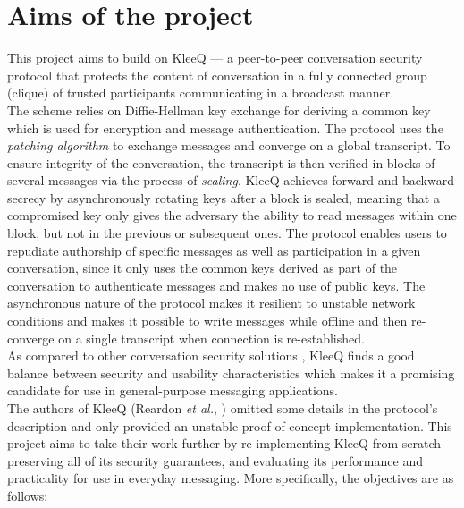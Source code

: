 \documentclass[a4paper, twoside, 12pt]{report}
\begin{document}
\section{Aims of the project}
\label{sec:intro.aims}
This project aims to build on KleeQ \cite{reardon2007kleeq} --- a peer-to-peer conversation security protocol that protects the content of conversation in a fully connected group (clique) of trusted participants communicating in a broadcast manner. \\

The scheme relies on Diffie-Hellman key exchange for deriving a common key which is used for encryption and message authentication. The protocol uses the \emph{patching algorithm} to exchange messages and converge on a global transcript. To ensure integrity of the conversation, the transcript is then verified in blocks of several messages via the process of \emph{sealing}. KleeQ achieves forward and backward secrecy by asynchronously rotating keys after a block is sealed, meaning that a compromised key only gives the adversary the ability to read messages within one block, but not in the previous or subsequent ones. The protocol enables users to repudiate authorship of specific messages as well as participation in a given conversation, since it only uses the common keys derived as part of the conversation to authenticate messages and makes no use of public keys. The asynchronous nature of the protocol makes it resilient to unstable network conditions and makes it possible to write messages while offline and then re-converge on a single transcript when connection is re-established. \\

As compared to other conversation security solutions \cite{unger2015sok}, KleeQ finds a good balance between security and usability characteristics which makes it a promising candidate for use in general-purpose messaging applications. \\

The authors of KleeQ (Reardon \textit{et al.}, \cite{reardon2007kleeq}) omitted some details in the protocol's description and only provided an unstable proof-of-concept implementation. This project aims to take their work further by re-implementing KleeQ from scratch preserving all of its security guarantees, and evaluating its performance and practicality for use in everyday messaging. More specifically, the objectives are as follows:
\end{document}
